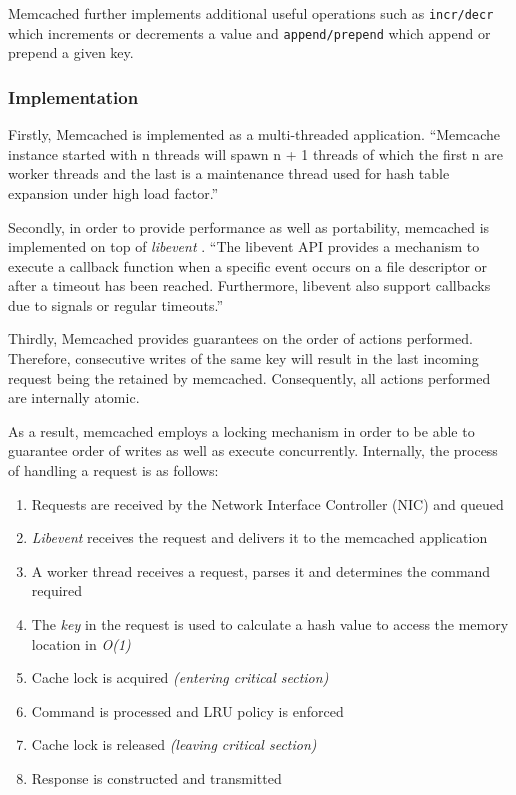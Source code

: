 Memcached further implements additional useful operations such as \texttt{incr/decr} which increments or decrements a value and \texttt{append/prepend} which append or prepend a given key.

\subsubsection{Implementation}
Firstly, Memcached is implemented as a multi-threaded application. ``Memcache instance started with n threads will spawn n + 1 threads of which the first n are worker threads and the last
is a maintenance thread used for hash table expansion under high load factor.'' \cite{solarflarememcached}

Secondly, in order to provide performance as well as  portability, memcached is implemented on top of \textit{libevent} \cite{libevent}. ``The libevent API provides a mechanism to execute a callback function when a specific event occurs on a file descriptor or after a timeout has been reached. Furthermore, libevent also support callbacks due to signals or regular timeouts.'' \cite{libevent}

Thirdly, Memcached provides guarantees on the order of actions performed. Therefore, consecutive writes of the same key will result in the last incoming request being the retained by memcached. Consequently, all actions performed are internally atomic.

As a result, memcached employs a locking mechanism in order to be able to guarantee order of writes as well as execute concurrently. Internally, the process of handling a request is as follows:

\begin{enumerate}
    \item Requests are received by the Network Interface Controller (NIC) and queued
    \item \emph{Libevent} receives the request and delivers it to the memcached application
    \item A worker thread receives a request, parses it and determines the command required
    \item The \emph{key} in the request is used to calculate a hash value to access the memory location in \emph{O(1)}
    \item Cache lock is acquired \emph{(entering critical section)}
    \item Command is processed and LRU policy is enforced
    \item Cache lock is released \emph{(leaving critical section)}
    \item Response is constructed and transmitted \cite{wiggins2012enhancing}
\end{enumerate}

